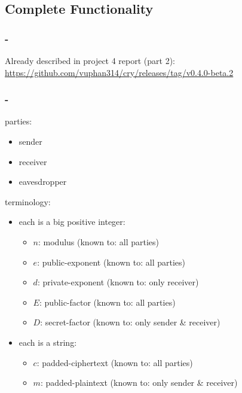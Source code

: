 \subsection{Complete Functionality}


\subsubsection{\rsa-\cs}

Already described in project 4 report (part 2):
\url{https://github.com/vuphan314/cry/releases/tag/v0.4.0-beta.2}


\subsubsection{\dummy-\cs}

parties:
\begin{itemize}
\item sender
\item receiver
\item eavesdropper
\end{itemize}

terminology:
\begin{itemize}
\item each  is a big positive integer:
  \begin{itemize}
  \item $n$: modulus (known to: all parties)
  \item $e$: public-exponent (known to: all parties)
  \item $d$: private-exponent (known to: only receiver)
  \item $E$: public-factor (known to: all parties)
  \item $D$: secret-factor
    (known to: only sender \& receiver)
  \end{itemize}
\item each  is a string:
  \begin{itemize}
  \item $c$: padded-ciphertext (known to: all parties)
  \item $m$: padded-plaintext
    (known to: only sender \& receiver)
  \end{itemize}
\end{itemize}

